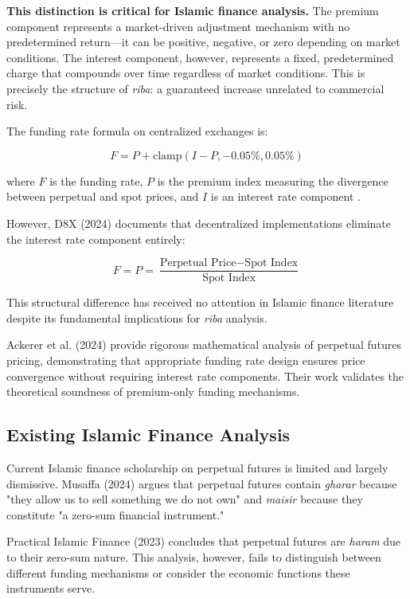 \documentclass[10pt,twocolumn]{article}
\begin{document}
\textbf{This distinction is critical for Islamic finance analysis.} The premium component represents a market-driven adjustment mechanism with no predetermined return---it can be positive, negative, or zero depending on market conditions. The interest component, however, represents a fixed, predetermined charge that compounds over time regardless of market conditions. This is precisely the structure of \textit{riba}: a guaranteed increase unrelated to commercial risk.

The funding rate formula on centralized exchanges is:

\begin{equation}
F = P + \text{clamp}(I - P, -0.05\%, 0.05\%)
\end{equation}

where $F$ is the funding rate, $P$ is the premium index measuring the divergence between perpetual and spot prices, and $I$ is an interest rate component \citep{Binance2019}.

However, D8X (2024) documents that decentralized implementations eliminate the interest rate component entirely:

\begin{equation}
F = P = \frac{\text{Perpetual Price} - \text{Spot Index}}{\text{Spot Index}}
\end{equation}

This structural difference has received no attention in Islamic finance literature despite its fundamental implications for \textit{riba} analysis.

Ackerer et al. (2024) provide rigorous mathematical analysis of perpetual futures pricing, demonstrating that appropriate funding rate design ensures price convergence without requiring interest rate components. Their work validates the theoretical soundness of premium-only funding mechanisms.

\subsection{Existing Islamic Finance Analysis}

Current Islamic finance scholarship on perpetual futures is limited and largely dismissive. Musaffa (2024) argues that perpetual futures contain \textit{gharar} because "they allow us to sell something we do not own" and \textit{maisir} because they constitute "a zero-sum financial instrument."

Practical Islamic Finance (2023) concludes that perpetual futures are \textit{haram} due to their zero-sum nature. This analysis, however, fails to distinguish between different funding mechanisms or consider the economic functions these instruments serve.
\end{document}
